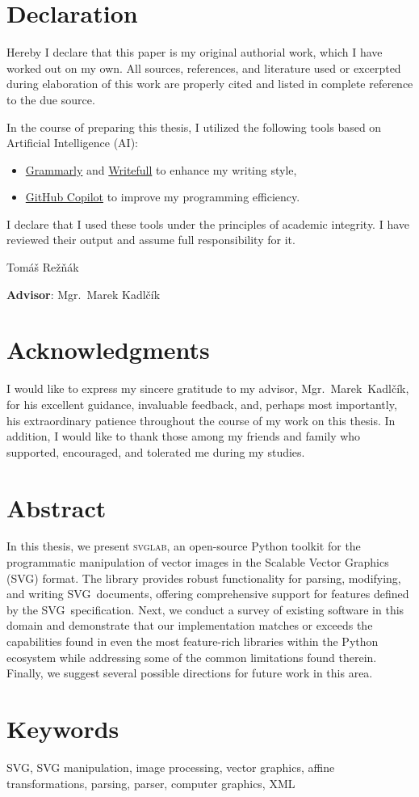 \section*{Declaration} Hereby I declare that this paper is my original authorial work, which
I have worked out on my own. All sources, references, and literature
used or excerpted during elaboration of this work are properly cited
and listed in complete reference to the due source. 

In the course of preparing this thesis, I utilized the following tools based on Artificial Intelligence (AI):
\begin{itemize}
    \item \href{https://www.grammarly.com/}{Grammarly} and \href{https://www.writefull.com/}{Writefull} to enhance my writing style,
    \item \href{https://github.com/features/copilot/}{GitHub Copilot} to improve my programming efficiency.
\end{itemize}

I declare that I used these tools under the principles of academic integrity. I have reviewed their output and assume full responsibility for it.
\vspace{1cm}
\begin{flushright}
    Tomáš Režňák
\end{flushright}

\vfill\noindent
\textbf{Advisor}: Mgr.~Marek Kadlčík
\cleardoublepage

\section*{Acknowledgments}

I would like to express my sincere gratitude to my advisor, Mgr.~Marek~Kadlčík, for his excellent guidance, invaluable feedback, and, perhaps most importantly, his extraordinary patience throughout the course of my work on this thesis. In addition, I would like to thank those among my friends and family who supported, encouraged, and tolerated me during my studies.

\cleardoublepage

\section*{Abstract}

In this thesis, we present \textsc{svglab}, an open-source Python toolkit for the programmatic manipulation of vector images in the Scalable Vector Graphics (SVG) format. The library provides robust functionality for parsing, modifying, and writing SVG~documents, offering comprehensive support for features defined by the SVG~specification. Next, we conduct a survey of existing software in this domain and demonstrate that our implementation matches or exceeds the capabilities found in even the most feature-rich libraries within the Python ecosystem while addressing some of the common limitations found therein. Finally, we suggest several possible directions for future work in this area.

\vfill

\section*{Keywords}

SVG, SVG manipulation, image processing, vector graphics, affine transformations, parsing, parser, computer graphics, XML

\cleardoublepage
